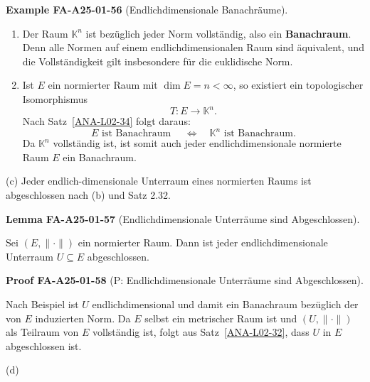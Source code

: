 \documentclass[10pt, letterpaper]{article}
\newcommand{\CustomHeading}[3]{%
  \par\medskip\noindent%
  \textbf{#1 #2} \textnormal{(#3)}.\enskip%
}
\newenvironment{LEM}[2]{\begin{unitbox}\CustomHeading{Lemma}{#1}{#2}}{\end{unitbox}}
\newenvironment{EXA}[2]{\begin{unitbox}\CustomHeading{Example}{#1}{#2}}{\end{unitbox}}
\newenvironment{PROOF}[2]{\begin{unitbox}\CustomHeading{Proof}{#1}{#2}}{\end{unitbox}}
\begin{document}
\begin{EXA}{FA-A25-01-56}{Endlichdimensionale Banachräume}
\begin{enumerate}
\item[(a)] Der Raum $\mathbb{K}^{n}$ ist bezüglich jeder Norm vollständig, also ein \textbf{Banachraum}.  
Denn alle Normen auf einem endlichdimensionalen Raum sind äquivalent, und die Vollständigkeit gilt insbesondere für die euklidische Norm.

\item[(b)] Ist $E$ ein normierter Raum mit $\dim E = n < \infty$, so existiert ein topologischer Isomorphismus
\[
T : E \longrightarrow \mathbb{K}^{n}.
\]
Nach Satz~\ref{ANA-L02-34} folgt daraus:
\[
E \text{ ist Banachraum } \quad \Longleftrightarrow \quad \mathbb{K}^{n} \text{ ist Banachraum}.
\]
Da $\mathbb{K}^{n}$ vollständig ist, ist somit auch jeder endlichdimensionale normierte Raum $E$ ein Banachraum.
\end{enumerate}
\end{EXA}



(c) Jeder endlich-dimensionale Unterraum eines normierten Raums ist abgeschlossen nach (b) und Satz 2.32.\\


\begin{LEM}{FA-A25-01-57}{Endlichdimensionale Unterräume sind Abgeschlossen}
Sei $(E,\|\cdot\|)$ ein normierter Raum. Dann ist jeder endlichdimensionale Unterraum $U \subseteq E$ abgeschlossen.
\end{LEM}


\begin{PROOF}{FA-A25-01-58}{P: Endlichdimensionale Unterräume sind Abgeschlossen}
Nach Beispiel ist $U$ endlichdimensional und damit ein Banachraum bezüglich der von $E$ induzierten Norm.  
Da $E$ selbst ein metrischer Raum ist und $(U,\|\cdot\|)$ als Teilraum von $E$ vollständig ist, folgt aus Satz~\ref{ANA-L02-32}, dass $U$ in $E$ abgeschlossen ist.
\end{PROOF}



(d) 
\end{document}
